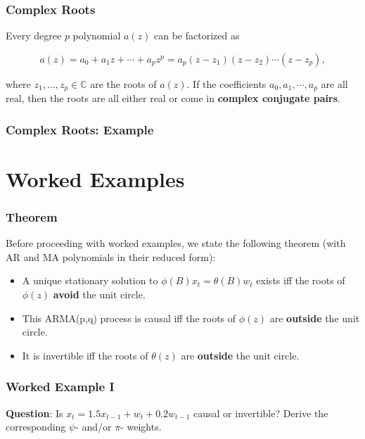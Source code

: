 \documentclass[%
xcolor=pdftex]{beamer}
\begin{document}
% 
% 
% 

\begin{frame}
\frametitle{Complex Roots}

Every degree $p$ polynomial $a(z)$ can be factorized as

$$
a(z) = a_0 + a_1 z + \cdots + a_p z^p = a_p(z-z_1)(z-z_2)\cdots(z-z_p),
$$

where $z_1, \ldots, z_p \in \mathbb{C}$ are the roots of $a(z)$. If the coefficients $a_0, a_1, \cdots, a_p$ are all real, then the roots are all either real or come in \textbf{complex conjugate pairs}.

\end{frame}

\begin{frame}
\frametitle{Complex Roots: Example}


\end{frame}

\section{Worked Examples}
\frame{\tableofcontents[currentsection]}

\begin{frame}
\frametitle{Theorem}

Before proceeding with worked examples, we state the following theorem (with AR and MA polynomials in their reduced form):

\begin{itemize}
\item A unique stationary solution to $\phi(B) x_t = \theta(B) w_t$ exists iff the roots of $\phi(z)$ \textbf{avoid} the unit circle.

\item This ARMA(p,q) process is causal iff the roots of $\phi(z)$ are \textbf{outside} the unit circle.

\item It is invertible iff the roots of $\theta(z)$ are \textbf{outside} the unit circle.
\end{itemize}
\end{frame}

\begin{frame}
\frametitle{Worked Example I}

\textbf{Question}: Is $x_t = 1.5x_{t-1} + w_t + 0.2 w_{t-1}$ causal or invertible? Derive the corresponding $\psi$- and/or $\pi$- weights.

\vspace{50mm}

\end{frame}
\end{document}
